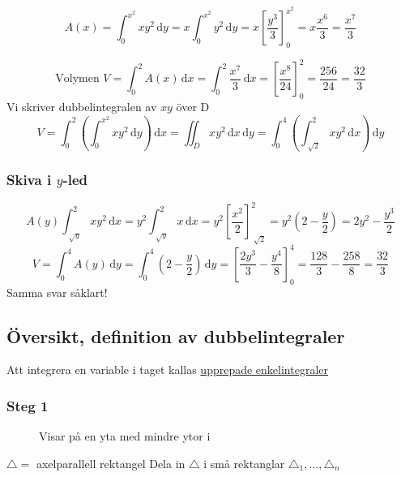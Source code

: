 \documentclass{article}
\let\oldsqrt\sqrt
\renewcommand*{\sqrt}[2][\ ]{\oldsqrt[#1]{#2} }
\begin{document}
$$
	A(x) = \int_0^{x^2}xy^2 \,\mathrm{d}y = x \int_0^{x^2} y^2 \,\mathrm{d}y = x\left[\frac{y^3}{3}\right]^{x^2}_0 = x \frac{x^6}{3} = \frac{x^7}{3}
$$

$$
	\text{Volymen }V = \int_0^2 A(x)\,\mathrm{d}x = \int_0^2 \frac{x^7}{3} \,\mathrm{d}x = \left[\frac{x^8}{24}\right]_0^2 = \frac{256}{24} = \frac{32}{3}
$$
Vi skriver dubbelintegralen av $xy$ över D
$$
	V = \int_0^2\left(\int_0^{x^2} xy^2 \,\mathrm{d}y \right)\,\mathrm{d}x = \iint_D xy^2 \,\mathrm{d}x\,\mathrm{d}y = \int_0^4 \left( \int_{\sqrt{2}}^2 xy^2 \,\mathrm{d}x \right) \,\mathrm{d}y
$$

\subsubsection{Skiva i \texorpdfstring{$y$}{y}-led}

$$
	A(y) \int_{\sqrt{y}}^2 xy^2 \,\mathrm{d}x = y^2 \int_{\sqrt{y}}^2 x \,\mathrm{d}x = y^2 \left[\frac{x^2}{2}\right]_{\sqrt{2}}^2 = y^2\left(2- \frac{y}{2}\right) = 2y^2 - \frac{y^3}{2}
$$
$$
	V = \int_0^4 A(y) \,\mathrm{d}y = \int_0^4 \left(2- \frac{y}{2}\right)\,\mathrm{d}y = \left[\frac{2y^3}{3} - \frac{y^4}{8}\right]_0^4 = \frac{128}{3} - \frac{258}{8} = \frac{32}{3}
$$
Samma svar såklart!

\newpage
\subsection{Översikt, definition av dubbelintegraler}
Att integrera en variable i taget kallas \underline{upprepade enkelintegraler}
\subsubsection{Steg 1}

\begin{figure}[ht] 
  \caption{Visar på en yta med mindre ytor i} \label{fig:9.3}
\end{figure}

$\triangle =$ axelparallell rektangel \newline
Dela in $\triangle$ i små rektanglar $\triangle_1,\ldots,\triangle_n$ \newline
\end{document}
